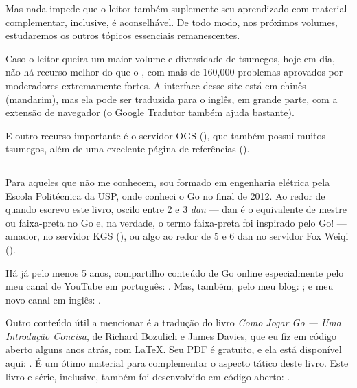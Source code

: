 Mas nada impede que o leitor também suplemente seu aprendizado com material complementar, inclusive, é aconselhável. De todo modo, nos próximos volumes, estudaremos os outros tópicos essenciais remanescentes.

Caso o leitor queira um maior volume e diversidade de tsumegos, hoje em dia, não há recurso melhor do que o , com mais de 160,000 problemas aprovados por moderadores extremamente fortes. A interface desse site está em chinês (mandarim), mas ela pode ser traduzida para o inglês, em grande parte, com a extensão de navegador  (o Google Tradutor também ajuda bastante).

E outro recurso importante é o servidor OGS (), que também possui muitos tsumegos, além de uma excelente página de referências ().

\vspace{-0.05cm}

\begin{center}
  \rule{3.25cm}{0.15mm}
\end{center}

\vspace{0.1cm}

Para aqueles que não me conhecem, sou formado em engenharia elétrica pela Escola Politécnica da USP, onde conheci o Go no final de 2012. Ao redor de quando escrevo este livro, oscilo entre 2 e 3 \emph{dan} --- dan é o equivalente de mestre ou faixa-preta no Go e, na verdade, o termo faixa-preta foi inspirado pelo Go! --- amador, no servidor KGS (), ou algo ao redor de 5 e 6 dan no servidor Fox Weiqi ().

Há já pelo menos 5 anos, compartilho conteúdo de Go online especialmente pelo meu canal de YouTube em português: . Mas, também, pelo meu blog: ; e meu novo canal em inglês: .

Outro conteúdo útil a mencionar é a tradução do livro \emph{Como Jogar Go --- Uma Introdução Concisa}, de Richard Bozulich e James Davies, que eu fiz em código aberto alguns anos atrás, com \LaTeX. Seu PDF é gratuito, e ela está disponível aqui: . É um ótimo material para complementar o aspecto tático deste livro. Este livro e série, inclusive, também foi desenvolvido em código aberto: .

